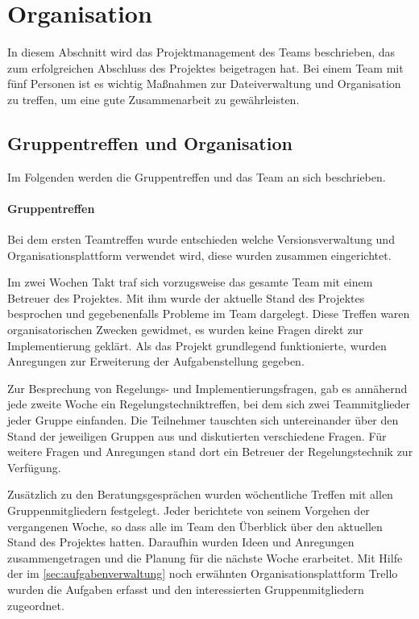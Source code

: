 \section{Organisation}
\label{cha:Organisation}
In diesem Abschnitt wird das Projektmanagement des Teams beschrieben, das zum erfolgreichen Abschluss des Projektes beigetragen hat. Bei einem Team mit fünf Personen ist es wichtig Maßnahmen zur Dateiverwaltung und Organisation zu treffen, um eine gute Zusammenarbeit zu gewährleisten.

\subsection{Gruppentreffen und Organisation}
\label{sec:gruppentreffenundorganisation}
Im Folgenden werden die Gruppentreffen und das Team an sich beschrieben.
\paragraph{Gruppentreffen}
Bei dem ersten Teamtreffen wurde entschieden welche Versionsverwaltung und Organisationsplattform verwendet wird, diese wurden zusammen eingerichtet.

Im zwei Wochen Takt traf sich vorzugsweise das gesamte Team mit einem Betreuer des Projektes. Mit ihm wurde der aktuelle Stand des Projektes besprochen und gegebenenfalls Probleme im Team dargelegt. Diese Treffen waren organisatorischen Zwecken gewidmet, es wurden keine Fragen direkt zur Implementierung geklärt. Als das Projekt grundlegend funktionierte, wurden Anregungen zur Erweiterung der Aufgabenstellung gegeben. 

Zur Besprechung von Regelungs- und Implementierungsfragen, gab es annähernd jede zweite Woche ein Regelungstechniktreffen, bei dem sich zwei Teammitglieder jeder Gruppe einfanden. Die Teilnehmer tauschten sich untereinander über den Stand der jeweiligen Gruppen aus und diskutierten verschiedene Fragen. Für weitere Fragen und Anregungen stand dort ein Betreuer der Regelungstechnik zur Verfügung.

Zusätzlich zu den Beratungsgesprächen wurden wöchentliche Treffen mit allen Gruppenmitgliedern festgelegt. Jeder berichtete von seinem Vorgehen der vergangenen Woche, so dass alle im Team den Überblick über den aktuellen Stand des Projektes hatten. Daraufhin wurden Ideen und Anregungen zusammengetragen und die Planung für die nächste Woche erarbeitet. Mit Hilfe der im \autoref{sec:aufgabenverwaltung} noch erwähnten Organisationsplattform Trello wurden die Aufgaben erfasst und den interessierten Gruppenmitgliedern zugeordnet. 

